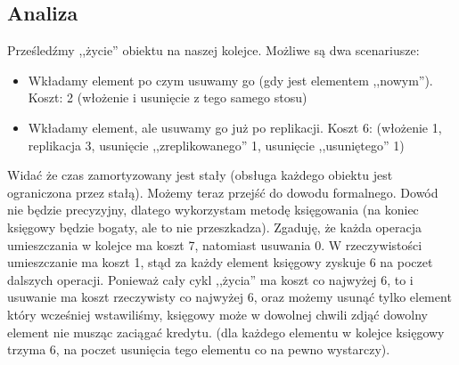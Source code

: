 \documentclass[a4paper,12pt]{article}
\begin{document}
\subsection*{Analiza}
Prześledźmy ,,życie'' obiektu na naszej kolejce. Możliwe są dwa scenariusze:
\begin{itemize}
 \item Wkładamy element po czym usuwamy go (gdy jest elementem ,,nowym''). Koszt: 2 (włożenie i usunięcie z tego samego stosu)
 \item Wkładamy element, ale usuwamy go już po replikacji. Koszt 6: (włożenie 1, replikacja 3, usunięcie ,,zreplikowanego'' 1, usunięcie ,,usuniętego'' 1)
\end{itemize}
Widać że czas zamortyzowany jest stały (obsługa każdego obiektu jest ograniczona przez stałą). Możemy teraz przejść do dowodu formalnego. Dowód nie będzie precyzyjny, dlatego wykorzystam metodę księgowania (na koniec księgowy będzie bogaty, ale to nie przeszkadza). Zgaduję, że każda operacja umieszczania w kolejce ma koszt 7, natomiast usuwania 0. W rzeczywistości umieszczanie ma koszt 1, stąd za każdy element księgowy zyskuje 6 na poczet dalszych operacji. Ponieważ cały cykl ,,życia'' ma koszt co najwyżej 6, to i usuwanie ma koszt rzeczywisty co najwyżej 6, oraz możemy usunąć tylko element który wcześniej wstawiliśmy, księgowy może w dowolnej chwili zdjąć dowolny element nie musząc zaciągać kredytu. (dla każdego elementu w kolejce księgowy trzyma 6, na poczet usunięcia tego elementu co na pewno wystarczy).
\end{document}
